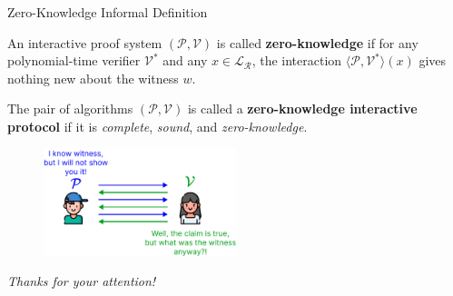 \documentclass[xcolor={usenames,dvipsnames}]{beamer}
\begin{document}
    \begin{frame}{Zero-Knowledge Informal Definition}
        \begin{definition}
            An interactive proof system $(\mathcal{P}, \mathcal{V})$ is called \textbf{zero-knowledge} if for any polynomial-time verifier $\mathcal{V}^*$ and any $x \in \mathcal{L}_{\mathcal{R}}$, the interaction $\langle \mathcal{P}, \mathcal{V}^* \rangle(x)$ gives nothing new about the witness $w$.
        \end{definition}
        
        \begin{definition}
            The pair of algorithms $(\mathcal{P}, \mathcal{V})$ is called a \textbf{zero-knowledge interactive protocol} if it is \textit{complete}, \textit{sound}, and \textit{zero-knowledge}.
        \end{definition}

        \begin{figure}
            \centering
            \includegraphics[width=0.5\textwidth]{images/lecture_6/zk.pdf}
        \end{figure}
    \end{frame}

	\begin{frame}{}
      \centering \Large
      \emph{Thanks for your attention!}
    \end{frame}
\end{document}

